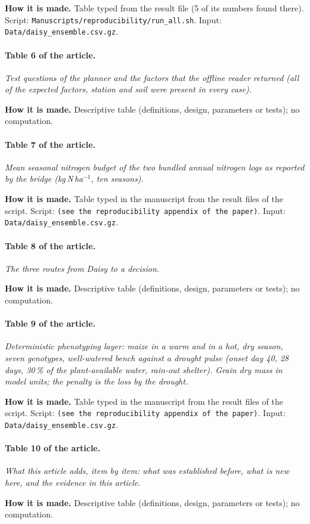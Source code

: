 \textbf{How it is made.} Table typed from the result file (5 of its numbers found there). Script: \nolinkurl{Manuscripts/reproducibility/run_all.sh}. Input: \nolinkurl{Data/daisy_ensemble.csv.gz}.

\paragraph{Table 6 of the article.} \emph{Test questions of the planner and the factors that the offline reader returned (all of the expected factors, station and soil were present in every case).}

\textbf{How it is made.} Descriptive table (definitions, design, parameters or tests); no computation.

\paragraph{Table 7 of the article.} \emph{Mean seasonal nitrogen budget of the two bundled annual nitrogen logs as reported by the bridge (kg\,N\,ha$^{-1}$, ten seasons).}

\textbf{How it is made.} Table typed in the manuscript from the result files of the script. Script: \nolinkurl{(see the reproducibility appendix of the paper)}. Input: \nolinkurl{Data/daisy_ensemble.csv.gz}.

\paragraph{Table 8 of the article.} \emph{The three routes from Daisy to a decision.}

\textbf{How it is made.} Descriptive table (definitions, design, parameters or tests); no computation.

\paragraph{Table 9 of the article.} \emph{Deterministic phenotyping layer: maize in a warm and in a hot, dry season, seven genotypes, well-watered bench against a drought pulse (onset day 40, 28 days, 30\,\% of the plant-available water, rain-out shelter). Grain dry mass in model units; the penalty is the loss by the drought.}

\textbf{How it is made.} Table typed in the manuscript from the result files of the script. Script: \nolinkurl{(see the reproducibility appendix of the paper)}. Input: \nolinkurl{Data/daisy_ensemble.csv.gz}.

\paragraph{Table 10 of the article.} \emph{What this article adds, item by item: what was established before, what is new here, and the evidence in this article.}

\textbf{How it is made.} Descriptive table (definitions, design, parameters or tests); no computation.
